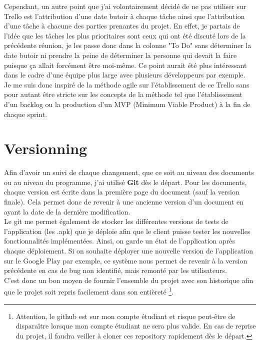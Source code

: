 \documentclass[UTF8]{EPURapport}
\begin{document}
Cependant, un autre point que j'ai volontairement décidé de ne pas utiliser sur Trello est l'attribution d'une date butoir à chaque tâche ainsi que l'attribution d'une tâche à chacune des parties prenantes du projet. En effet, je partais de l'idée que les tâches les plus prioritaires sont ceux qui ont été discuté lors de la précédente réunion, je les passe donc dans la colonne "To Do" sans déterminer la date butoir ni prendre la peine de déterminer la personne qui devait la faire puisque ça allait forcément être moi-même. Ce point aurait été plus intéressant dans le cadre d'une équipe plus large avec plusieurs développeurs par exemple. \\

Je me suis donc inspiré de la méthode agile sur l'établissement de ce Trello sans pour autant être stricte sur les concepts de la méthode tel que l'établissement d'un backlog ou la production d'un MVP (Minimum Viable Product) à la fin de chaque sprint. 

\section{Versionning}

Afin d'avoir un suivi de chaque changement, que ce soit au niveau des documents ou au niveau du programme, j'ai utilisé \textbf{Git} dès le départ. Pour les documents, chaque version est écrite dans la première page du document (sauf la version finale). Cela permet donc de revenir à une ancienne version d'un document en ayant la date de la dernière modification.\\

Le git me permet également de stocker les différentes versions de tests de l'application (les .apk) que je déploie afin que le client puisse tester les nouvelles fonctionnalités implémentées. Ainsi, on garde un état de l'application après chaque déploiement. Si on souhaite déployer une nouvelle version de l'application sur le Google Play par exemple, ce système nous permet de revenir à la version précédente en cas de bug non identifié, mais remonté par les utilisateurs.\\

C'est donc un bon moyen de fournir l'ensemble du projet avec son historique afin que le projet soit repris facilement dans son entièreté \footnote{Attention, le github est sur mon compte étudiant et risque peut-être de disparaître lorsque mon compte étudiant ne sera plus valide. En cas de reprise du projet, il faudra veiller à cloner ces repository rapidement dès le départ.}.
\end{document}
